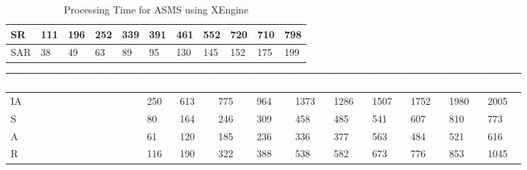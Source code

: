 \begin{table}[t]
\begin{tabular}{|l|l|l|l|l|l|l|l|l|l|l|}
\scriptsize  {SR}
& \scriptsize  {111}
& \scriptsize {196}
& \scriptsize {252}
& \scriptsize {339}
& \scriptsize {391}
& \scriptsize {461}
& \scriptsize {552}
& \scriptsize {720}
& \scriptsize {710}
& \scriptsize {798}
\\ \hline

\scriptsize  {SAR}
& \scriptsize {38}
& \scriptsize {49}
& \scriptsize {63}
& \scriptsize {89}
& \scriptsize {95}
& \scriptsize {130}
& \scriptsize {145}
& \scriptsize {152}
& \scriptsize {175}
& \scriptsize {199}
\\ \hline
\end{tabular}

\caption{Processing Time for ASMS using XEngine}\end{table}
\begin{table}[t]
\centering
\begin{tabular}{|l|l|l|l|l|l|l|l|l|l|l|}   
\hline  \rowcolor{black} \scriptsize \bf \textcolor {white}{ Requests Number (LMS)}
& \scriptsize \bf \textcolor {white}{5000}
& \scriptsize \bf \textcolor {white}{10000}
& \scriptsize \bf \textcolor  {white}{15000}
& \scriptsize \bf \textcolor  {white}{20000}
& \scriptsize \bf \textcolor  {white}{25000}
& \scriptsize \bf \textcolor  {white}{30000} 
& \scriptsize \bf \textcolor  {white}{35000}
& \scriptsize \bf \textcolor  {white}{40000}
& \scriptsize \bf \textcolor  {white}{45000}
& \scriptsize \bf \textcolor {white}{50000}\\ \hline



\scriptsize  {IA }
& \scriptsize  {250}
& \scriptsize {613}
& \scriptsize {775}
& \scriptsize {964}
& \scriptsize {1373}
& \scriptsize {1286}
& \scriptsize {1507}
& \scriptsize {1752}
& \scriptsize {1980}
& \scriptsize {2005}
\\ \hline

\scriptsize  {S }
& \scriptsize  {80}
& \scriptsize {164}
& \scriptsize {246}
& \scriptsize {309}
& \scriptsize {458}
& \scriptsize {485}
& \scriptsize {541}
& \scriptsize {607}
& \scriptsize {810}
& \scriptsize {773}
\\ \hline

\scriptsize  {A}
& \scriptsize  {61}
& \scriptsize {120}
& \scriptsize {185}
& \scriptsize {236}
& \scriptsize {336}
& \scriptsize {377}
& \scriptsize {563}
& \scriptsize {484}
& \scriptsize {521}
& \scriptsize {616}
\\ \hline

					
\scriptsize  {R}
& \scriptsize  {116}
& \scriptsize {190}
& \scriptsize {322}
& \scriptsize {388}
& \scriptsize {538}
& \scriptsize {582}
& \scriptsize {673}
& \scriptsize {776}
& \scriptsize {853}
& \scriptsize {1045}
\\ \hline


\end{tabular}
\end{table}
